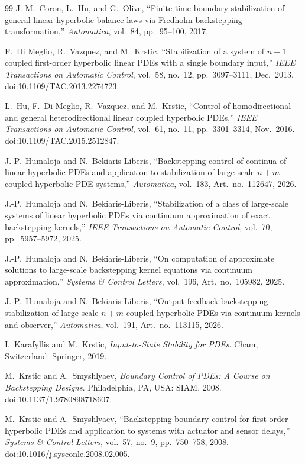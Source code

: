 \documentclass[12pt]{article}
\theoremstyle{plain}
\theoremstyle{remark}
\begin{document}
\begin{thebibliography}{99}
J.-M.~Coron, L.~Hu, and G.~Olive,
``Finite-time boundary stabilization of general linear hyperbolic balance laws via Fredholm backstepping transformation,''
\emph{Automatica}, vol.~84, pp.~95--100, 2017.

F.~Di Meglio, R.~Vazquez, and M.~Krstic,
``Stabilization of a system of $n+1$ coupled first-order hyperbolic linear PDEs with a single boundary input,''
\emph{IEEE Transactions on Automatic Control}, vol.~58, no.~12, pp.~3097--3111, Dec.~2013.
doi:10.1109/TAC.2013.2274723.

L.~Hu, F.~Di Meglio, R.~Vazquez, and M.~Krstic,
``Control of homodirectional and general heterodirectional linear coupled hyperbolic PDEs,''
\emph{IEEE Transactions on Automatic Control}, vol.~61, no.~11, pp.~3301--3314, Nov.~2016.
doi:10.1109/TAC.2015.2512847.

J.-P.~Humaloja and N.~Bekiaris-Liberis,
``Backstepping control of continua of linear hyperbolic PDEs and application to stabilization of large-scale $n+m$ coupled hyperbolic PDE systems,''
\emph{Automatica}, vol.~183, Art.~no.~112647, 2026.

J.-P.~Humaloja and N.~Bekiaris-Liberis,
``Stabilization of a class of large-scale systems of linear hyperbolic PDEs via continuum approximation of exact backstepping kernels,''
\emph{IEEE Transactions on Automatic Control}, vol.~70, pp.~5957--5972, 2025.

J.-P.~Humaloja and N.~Bekiaris-Liberis,
``On computation of approximate solutions to large-scale backstepping kernel equations via continuum approximation,''
\emph{Systems \& Control Letters}, vol.~196, Art.~no.~105982, 2025.

J.-P.~Humaloja and N.~Bekiaris-Liberis,
``Output-feedback backstepping stabilization of large-scale $n+m$ coupled hyperbolic PDEs via continuum kernels and observer,''
\emph{Automatica}, vol.~191, Art.~no.~113115, 2026.


I.~Karafyllis and M.~Krstic,
\emph{Input-to-State Stability for PDEs}.
Cham, Switzerland: Springer, 2019.

M.~Krstic and A.~Smyshlyaev,
\emph{Boundary Control of PDEs: A Course on Backstepping Designs}.
Philadelphia, PA, USA: SIAM, 2008.
doi:10.1137/1.9780898718607.

M.~Krstic and A.~Smyshlyaev,
``Backstepping boundary control for first-order hyperbolic PDEs and application to systems with actuator and sensor delays,''
\emph{Systems \& Control Letters}, vol.~57, no.~9, pp.~750--758, 2008.
doi:10.1016/j.sysconle.2008.02.005.


\end{thebibliography}
\end{document}
